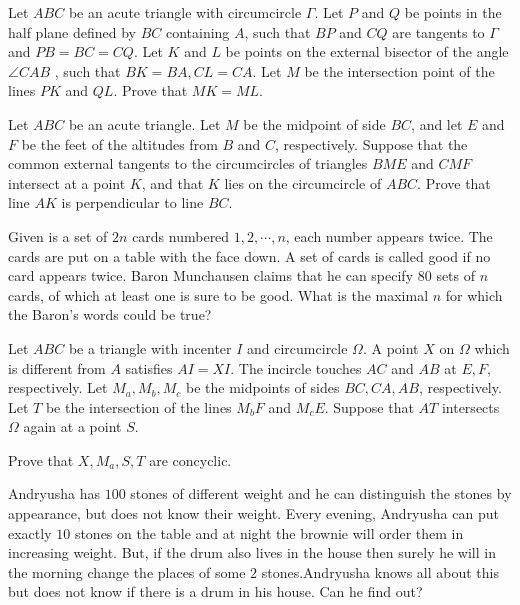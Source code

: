 \documentclass[11pt]{scrartcl}
\begin{document}
\begin{problem}[3104932449951237120]
	Let $ABC$ be an acute triangle with circumcircle $\Gamma$. Let $P$ and $Q$ be points in the half plane defined by $BC$ containing $A$, such that $BP$ and $CQ$ are tangents to $\Gamma$ and $PB = BC = CQ$. Let $K$ and $L$ be points on the external bisector of the angle $\angle CAB$ , such that $BK = BA, CL = CA$. Let $M$ be the intersection point of the lines $PK$ and $QL$. Prove that $MK=ML$.
\end{problem}
\begin{problem}[4018921933875333744]
	Let $ABC$ be an acute triangle. Let $M$ be the midpoint of side $BC$, and let $E$ and $F$ be the feet of the altitudes from $B$ and $C$, respectively. Suppose that the common external tangents to the circumcircles of triangles $BME$ and $CMF$ intersect at a point $K$, and that $K$ lies on the circumcircle of $ABC$. Prove that line $AK$ is perpendicular to line $BC$.
\end{problem}
\begin{problem}[2989958142304279488]
Given is a set of $2n$ cards numbered $1,2, \cdots, n$, each number appears twice. The cards are put on a table with the face down. A set of cards is called good if no card appears twice. Baron Munchausen claims that he can specify $80$ sets of $n$ cards, of which at least one is sure to be good. What is the maximal $n$ for which the Baron's words could be true?
\end{problem}
\begin{problem}[727078403801409]
Let $ABC$ be a triangle with incenter $I$ and circumcircle $\Omega$. A point $X$ on $\Omega$ which is different from $A$ satisfies $AI=XI$. The incircle touches $AC$ and $AB$ at $E, F$, respectively. Let $M_a, M_b, M_c$ be the midpoints of sides $BC, CA, AB$, respectively. Let $T$ be the intersection of the lines $M_bF$ and $M_cE$. Suppose that $AT$ intersects $\Omega$ again at a point $S$.

Prove that $X, M_a, S, T$ are concyclic.
\end{problem}
\begin{problem}[499788610931519]
	Andryusha has $100$ stones of different weight and he can distinguish the stones by appearance, but does not know their weight. Every evening, Andryusha can put exactly $10$ stones on the table and at night the brownie will order them in increasing weight. But, if the drum also lives in the house then surely he will in the morning change the places of some $2$ stones.Andryusha knows all about this but does not know if there is a drum in his house. Can he find out?
\end{problem}
\end{document}
